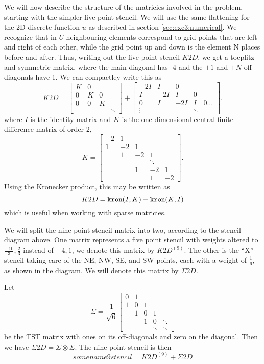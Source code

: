 We will now describe the structure of the matricies involved in the problem, starting with the simpler five point stencil.
We will use the same flattening for the 2D discrete function $u$ as described in section \ref{sec:exc3:numerical}.
We recognize that in $U$ neighbouring elements correspond to grid points that are left and right of each other, while the grid point up and down is the element N places before and after.
Thus, writing out the five point stencil $K2D$, we get a toeplitz and symmetric matrix, where the main diagonal has -4 and the $\pm 1$ and $\pm N$ off diagonals have 1.
We can compactley write this as
$$
K2D =
\begin{bmatrix}
  K & 0 \\
  0 & K & 0\\
  0 & 0 & K \\
  &&&\ddots
\end{bmatrix}
+
\begin{bmatrix}
  -2I & I & 0 &  \\
  I & -2I & I & 0 \\
  0 & I & -2I & I & 0 \dots\\
  \vdots&&&\ddots
\end{bmatrix}.
$$
where $I$ is the identity matrix and $K$ is the one dimensional central finite difference matrix of order 2,
$$
K =
\begin{bmatrix}
  -2 & 1 &   \\
  1 & -2 & 1 &  \\
  & 1 & -2 & 1 & \\
  &&&\ddots\\
  && 1 & -2 & 1\\
  &&& 1 & -2
\end{bmatrix}.
$$
Using the Kronecker product, this may be written as
$$
K2D = \verb|kron|(I, K) + \verb|kron|(K, I)
$$
which is useful when working with sparse matricies.

We will split the nine point stencil matrix into two, according to the stencil diagram above.
One matrix represents a five point stencil with weights altered to $\frac{-10}{3}, \frac23$ instead of $-4, 1$, we denote this matrix by $K2D^{(9)}$.
The other is the ``X''-stencil taking care of the NE, NW, SE, and SW points, each with a weight of $\frac16$, as shown in the diagram.
We will denote this matrix by $\Sigma 2D$.

Let
\begin{equation}
  \Sigma =
  \frac{1}{\sqrt{6}}
  \begin{bmatrix}
    0 & 1  \\
    1 & 0 & 1 \\
      & 1 & 0 & 1 \\
      &   & 1 & 0 & \ddots\\
      &   &   & \ddots  & \ddots
  \end{bmatrix}
\end{equation}
be the TST matrix with ones on its off-diagonals and zero on the diagonal.
Then we have $\Sigma 2D = \Sigma \otimes \Sigma$.
The nine point stencil is then
\begin{equation}
  somename9stencil = K2D^{(9)} + \Sigma 2D
\end{equation}

